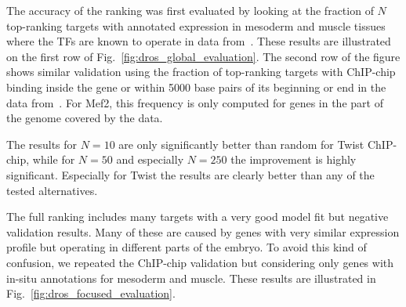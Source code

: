 \documentclass{pnastwo}
\begin{document}
\begin{article}
The accuracy of the ranking was first evaluated by looking at the
fraction of $N$ top-ranking targets with annotated expression in
mesoderm and muscle tissues where the TFs are known to operate in data
from~\cite{Tomancak2002}.  These results are illustrated on the first
row of Fig.~\ref{fig:dros_global_evaluation}.  The second row of the
figure shows similar validation using the fraction of top-ranking
targets with ChIP-chip binding inside the gene or within 5000 base
pairs of its beginning or end in the data
from~\cite{Sandmann2006a,Sandmann2007a}.  For Mef2, this frequency is
only computed for genes in the part of the genome covered by the data.

The results for $N=10$ are only significantly better than random for
Twist ChIP-chip, while for $N=50$ and especially $N=250$ the
improvement is highly significant.  Especially for Twist the results
are clearly better than any of the tested alternatives.

The full ranking includes many targets with a very good model fit but
negative validation results.  Many of these are caused by genes with
very similar expression profile but operating in different parts of
the embryo.  To avoid this kind of confusion, we repeated the
ChIP-chip validation but considering only genes with in-situ
annotations for mesoderm and muscle.  These results are illustrated in
Fig.~\ref{fig:dros_focused_evaluation}.


\end{article}
\end{document}
